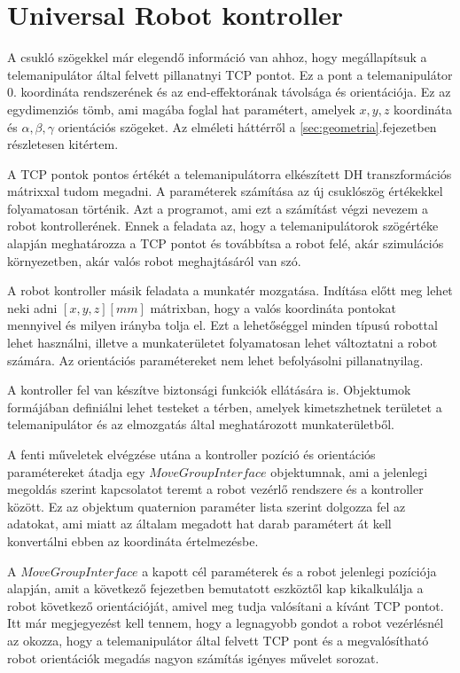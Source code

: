 \section{Universal Robot kontroller}

A csukló szögekkel már elegendő információ van ahhoz, hogy megállapítsuk a telemanipulátor által felvett pillanatnyi TCP pontot. Ez a pont a telemanipulátor 0. koordináta rendszerének és az end-effektorának távolsága és orientációja. Ez az egydimenziós tömb, ami magába foglal hat paramétert, amelyek $x,y,z$ koordináta és $\alpha,\beta,\gamma$ orientációs szögeket. Az elméleti háttérről a \ref{sec:geometria}.fejezetben részletesen kitértem.

A TCP pontok pontos értékét a telemanipulátorra elkészített DH transzformációs mátrixxal tudom megadni. A paraméterek számítása az új csuklószög értékekkel folyamatosan történik. Azt a programot, ami ezt a számítást végzi nevezem a robot kontrollerének. Ennek a feladata az, hogy a telemanipulátorok szögértéke alapján meghatározza a TCP pontot és továbbítsa a robot felé, akár szimulációs környezetben, akár valós robot meghajtásáról van szó.

A robot kontroller másik feladata a munkatér mozgatása. Indítása előtt meg lehet neki adni $[x,y,z] [mm]$ mátrixban, hogy a valós koordináta pontokat mennyivel és milyen irányba tolja el. Ezt a lehetőséggel minden típusú robottal lehet használni, illetve a munkaterületet folyamatosan lehet változtatni a robot számára. Az orientációs paramétereket nem lehet befolyásolni pillanatnyilag.

A kontroller fel van készítve biztonsági funkciók ellátására is. Objektumok formájában definiálni lehet testeket a térben, amelyek kimetszhetnek területet a telemanipulátor és az elmozgatás által meghatározott munkaterületből.

A fenti műveletek elvégzése utána a kontroller pozíció és orientációs paramétereket átadja egy $MoveGroupInterface$ objektumnak, ami a jelenlegi megoldás szerint kapcsolatot teremt a robot vezérlő rendszere és a kontroller között. Ez az objektum quaternion paraméter lista szerint dolgozza fel az adatokat, ami miatt az általam megadott hat darab paramétert át kell konvertálni ebben az koordináta értelmezésbe.

A $MoveGroupInterface$ a kapott cél paraméterek és a robot jelenlegi pozíciója alapján, amit a következő fejezetben bemutatott eszköztől kap kikalkulálja a robot következő orientációját, amivel meg tudja valósítani a kívánt TCP pontot. Itt már megjegyezést kell tennem, hogy a legnagyobb gondot a robot vezérlésnél az okozza, hogy a telemanipulátor által felvett TCP pont és a megvalósítható robot orientációk megadás nagyon számítás igényes művelet sorozat.

